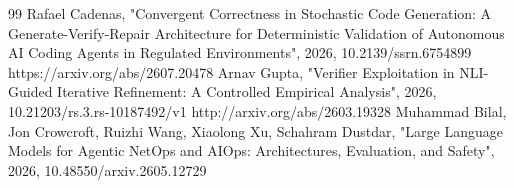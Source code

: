 \documentclass[conference]{IEEEtran}
\begin{document}
\begin{thebibliography}{99}
 Rafael Cadenas, "Convergent Correctness in Stochastic Code Generation: A Generate-Verify-Repair Architecture for Deterministic Validation of Autonomous AI Coding Agents in Regulated Environments", 2026, 10.2139/ssrn.6754899
 https://arxiv.org/abs/2607.20478
 Arnav Gupta, "Verifier Exploitation in NLI-Guided Iterative Refinement: A Controlled Empirical Analysis", 2026, 10.21203/rs.3.rs-10187492/v1
 http://arxiv.org/abs/2603.19328
 Muhammad Bilal, Jon Crowcroft, Ruizhi Wang, Xiaolong Xu, Schahram Dustdar, "Large Language Models for Agentic NetOps and AIOps: Architectures, Evaluation, and Safety", 2026, 10.48550/arxiv.2605.12729
\end{thebibliography}
\end{document}
